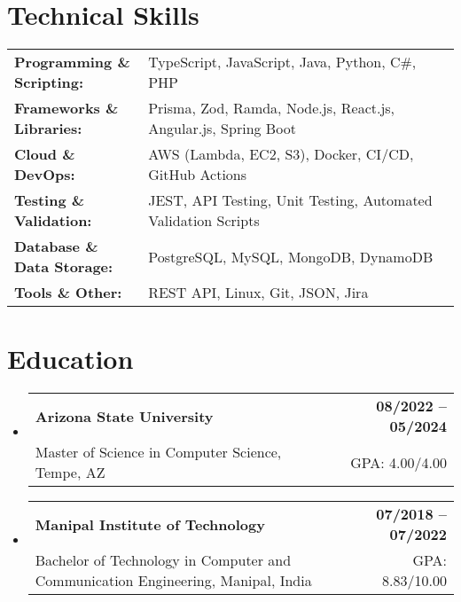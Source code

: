 \documentclass[letterpaper,11pt]{article}
\makeatletter
\newcommand{\educationSubheading}[4]{
  \vspace{-2pt}\item
    \begin{tabular*}{1.0\textwidth}[t]{l@{\extracolsep{\fill}}r}
      \textbf{\small #1} & \textbf{\small #2} \\
      {\small#3} & {\small #4} \\
    \end{tabular*}\vspace{-7pt}
}
\newcommand{\resumeSubHeadingListStart}{\begin{itemize}[leftmargin=0pt, label={}]}
\newcommand{\resumeSubHeadingListEnd}{\end{itemize}}
\makeatother
\begin{document}
\section{Technical Skills}
        \vspace{-14pt}
        \begin{table}[h]
            \footnotesize
            \begin{tabular}{p{0.3\linewidth} p{0.7\linewidth}}
                \textbf{Programming \& Scripting:} & TypeScript, JavaScript, Java, Python, C\#, PHP \\
                \textbf{Frameworks \& Libraries:} & Prisma, Zod, Ramda, Node.js, React.js, Angular.js, Spring Boot \\
                \textbf{Cloud \& DevOps:} & AWS (Lambda, EC2, S3), Docker, CI/CD, GitHub Actions \\
                \textbf{Testing \& Validation:} & JEST, API Testing, Unit Testing, Automated Validation Scripts \\
                \textbf{Database \& Data Storage:} & PostgreSQL, MySQL, MongoDB, DynamoDB \\
                \textbf{Tools \& Other:} & REST API, Linux, Git, JSON, Jira \\
            \end{tabular}
        \end{table}

 \vspace{-15pt}

\section{Education}
  \resumeSubHeadingListStart
    \educationSubheading
      {Arizona State University}{08/2022 -- 05/2024}
      {Master of Science in Computer Science, Tempe, AZ}{GPA: 4.00/4.00}

    \educationSubheading
      {Manipal Institute of Technology}{07/2018 -- 07/2022}
      {Bachelor of Technology in Computer and Communication Engineering, Manipal, India}{GPA: 8.83/10.00}
  \resumeSubHeadingListEnd
\end{document}
